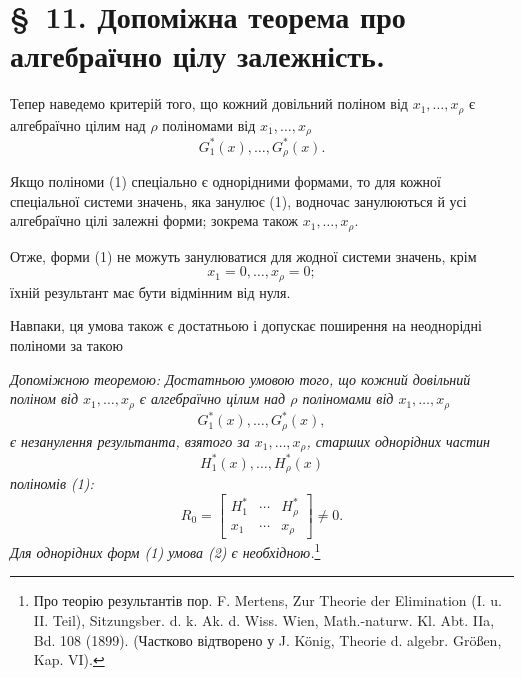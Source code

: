 \documentclass[11pt]{article}
\begin{document}
\section*{\S\ 11. Допоміжна теорема про алгебраїчно цілу залежність.}

Тепер наведемо критерій того, що кожний довільний поліном від $x_1,\ldots,x_\rho$ є алгебраїчно цілим над $\rho$ поліномами від $x_1,\ldots,x_\rho$
\begin{equation}
  G_1^*(x),\ldots,G_\rho^*(x).
\tag{1}
\end{equation}

Якщо поліноми (1) спеціально є однорідними формами, то для кожної спеціальної системи значень, яка занулює (1), водночас занулюються й усі алгебраїчно цілі залежні форми; зокрема також $x_1,\ldots,x_\rho$.

Отже, форми (1) не можуть занулюватися для жодної системи значень, крім
\[
  x_1=0,\ldots,x_\rho=0;
\]
їхній результант має бути відмінним від нуля.

Навпаки, ця умова також є достатньою і допускає поширення на неоднорідні поліноми за такою

\emph{Допоміжною теоремою: Достатньою умовою того, що кожний довільний поліном від $x_1,\ldots,x_\rho$ є алгебраїчно цілим над $\rho$ поліномами від $x_1,\ldots,x_\rho$}
\[
  G_1^*(x),\ldots,G_\rho^*(x),
\]
\emph{є незанулення результанта, взятого за $x_1,\ldots,x_\rho$, старших однорідних частин}
\[
  H_1^*(x),\ldots,H_\rho^*(x)
\]
\emph{поліномів (1):}
\begin{equation}
  R_0=\left[
  \begin{array}{ccc}
    H_1^*&\cdots&H_\rho^*\\
    x_1&\cdots&x_\rho
  \end{array}
  \right]\ne0.
\tag{2}
\end{equation}
\emph{Для однорідних форм (1) умова (2) є необхідною.}\footnote{Про теорію результантів пор. F. Mertens, Zur Theorie der Elimination (I. u. II. Teil), Sitzungsber. d. k. Ak. d. Wiss. Wien, Math.-naturw. Kl. Abt. IIa, Bd. 108 (1899). (Частково відтворено у J. König, Theorie d. algebr. Größen, Kap. VI).}
\end{document}

